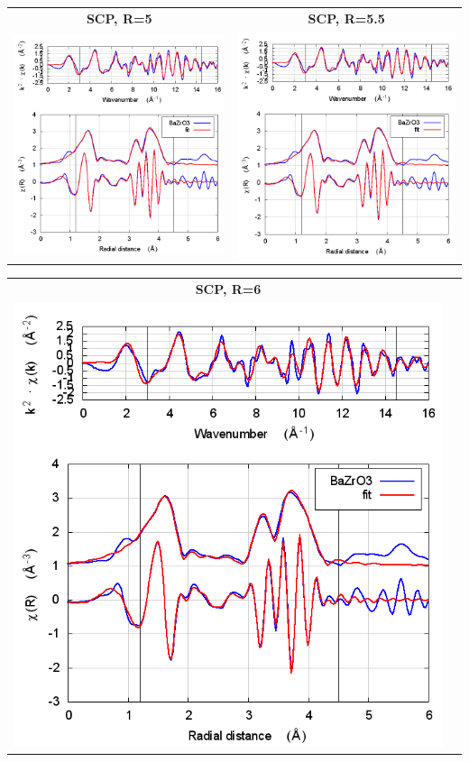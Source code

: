 \documentclass[11pt]{article}
\begin{document}
\begin{center}
  \begin{tabular}{cc}
    \textbf{SCP, R=5} & \textbf{SCP, R=5.5} \\ 
    \includegraphics[width=.45\linewidth]{BaZrO3/scf/fit_withSCF_5.png} & 
    \includegraphics[width=.45\linewidth]{BaZrO3/scf/fit_withSCF_5.5.png} \\
  \end{tabular}
\end{center}
\begin{center}
  \begin{tabular}{cc}
    \textbf{SCP, R=6}&\\
    \includegraphics[width=.45\linewidth]{BaZrO3/scf/fit_withSCF_6.png}&\\
  \end{tabular}
\end{center}
\end{document}
